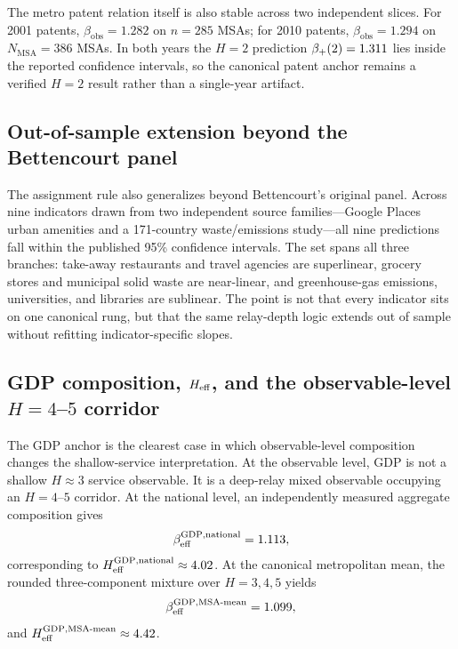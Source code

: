 The metro patent relation itself is also stable across two independent slices.
For 2001 patents, $\beta_{\mathrm{obs}}=1.282$ on $n=285$ MSAs; for 2010
patents, $\beta_{\mathrm{obs}}=1.294$ on $N_{\mathrm{MSA}}=386$ MSAs. In
both years the $H=2$ prediction $\beta_+\!\left(2\right)=1.311$ lies inside the reported
confidence intervals, so the canonical patent anchor remains a verified
$H=2$ result rather than a single-year artifact.

\subsection{Out-of-sample extension beyond the Bettencourt panel}
The assignment rule also generalizes beyond Bettencourt's original panel. Across
nine indicators drawn from two independent source families---Google Places urban
amenities and a 171-country waste/emissions study---all nine predictions fall
within the published 95\% confidence intervals. The set spans all three
branches: take-away restaurants and travel agencies are superlinear, grocery
stores and municipal solid waste are near-linear, and greenhouse-gas emissions,
universities, and libraries are sublinear. The point is not that every
indicator sits on one canonical rung, but that the same relay-depth logic
extends out of sample without refitting indicator-specific slopes.

\subsection{GDP composition, \(H_{\mathrm{eff}}\), and the observable-level \(H=4\)--\(5\) corridor}
The GDP anchor is the clearest case in which observable-level composition changes the shallow-service interpretation. At the observable level, GDP is not a shallow \(H\approx 3\) service observable. It is a deep-relay mixed observable occupying an \(H=4\)--\(5\) corridor. At the national level, an independently measured aggregate composition gives
\begin{equation}
\beta_{\mathrm{eff}}^{\mathrm{GDP,national}}=1.113,
\label{eq:gdp_nat}
\end{equation}
corresponding to
\(H_{\mathrm{eff}}^{\mathrm{GDP,national}}\approx 4.02\). At the canonical metropolitan
mean, the rounded three-component mixture over \(H=3,4,5\) yields
\begin{equation}
\beta_{\mathrm{eff}}^{\mathrm{GDP,MSA\text{-}mean}}=1.099,
\label{eq:gdp_msa_mean}
\end{equation}
and \(H_{\mathrm{eff}}^{\mathrm{GDP,MSA\text{-}mean}}\approx 4.42\).

